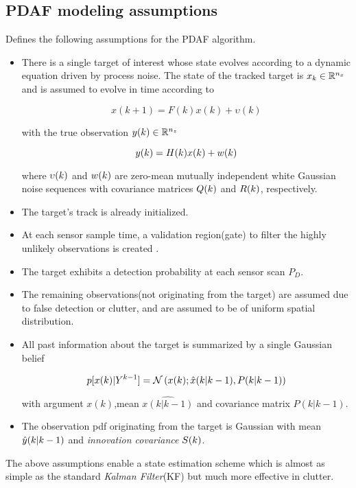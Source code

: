\subsection{PDAF modeling assumptions}
\cite{BarShalom1980} Defines the following assumptions for the PDAF algorithm.
\begin{itemize}
	\item There is a single target of interest whose state evolves according to a dynamic equation driven by process noise. The state of the tracked target is $x_k \in {\mathbb{R}}^{n_x} $ and is assumed to evolve in time according to 
	
	\begin{equation}\label{eq:stateEvolution}
	x(k+1) = F(k)x(k) + \upsilon(k)
	\end{equation}
	
	with the true observation ${y}(k) \in {\mathbb{R}}^{n_z}$ 
	
	\[ {y}(k) = H(k)x(k) + w(k) \]

	where ${\upsilon}(k)$ and ${w}(k)$ are zero-mean mutually independent white Gaussian noise sequences with covariance matrices ${Q}(k)$ and ${R}(k)$, respectively.
	\item The target's track is already initialized.
	\item At each sensor sample time, a validation region(gate) to filter the highly unlikely observations is created \cite{Shalom1995}.
	\item The target exhibits a detection probability at each sensor scan $P_D$.
	\item The remaining observations(not originating from the target) are assumed due to false detection or clutter, and are assumed to be of uniform spatial distribution.
	\item All past information about the target is summarized by a single Gaussian belief
	
	
	\begin{equation}\label{eq:gaussAssumption}
	p[x(k)|{Y}^{k-1}] = \mathcal{N}\left(x(k);\hat{x}(k|k-1),P(k|k-1)\right)
	\end{equation}
	
	
	
	with argument $x(k)$,mean $\hat{x(k|k-1)}$ and covariance matrix $P(k|k-1)$.
	\item The observation pdf originating from the target is Gaussian with mean ${\hat{{y}}}(k|k-1)$ and \emph{innovation covariance}  ${S}(k)$.
\end{itemize}
The above assumptions enable a state estimation scheme which is almost as simple as the standard \emph{Kalman Filter}(KF) but much more effective in clutter.
